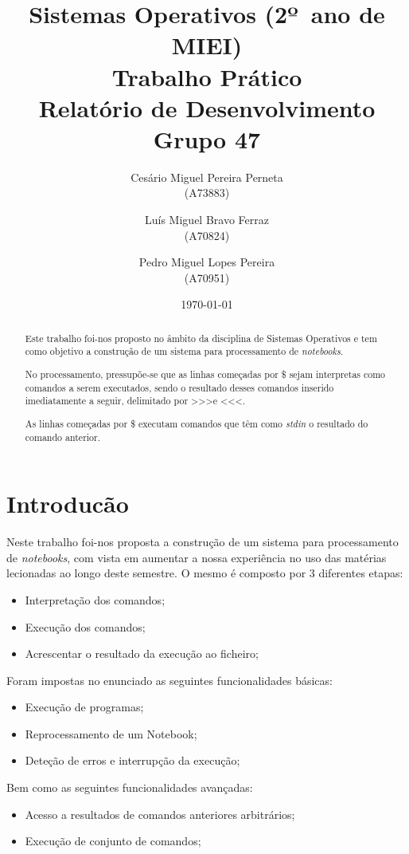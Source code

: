 \documentclass{report}
\title{Sistemas Operativos (2º\ ano de MIEI)\\ \textbf{Trabalho Prático  }\\ Relatório de Desenvolvimento\\ Grupo 47}
\author{Cesário Miguel Pereira Perneta\\ (A73883) \and Luís Miguel Bravo Ferraz\\ (A70824) \and Pedro Miguel Lopes Pereira\\ (A70951) }
\date {\today }
\begin{document}
\maketitle

\begin{abstract}

\indent Este trabalho foi-nos proposto no âmbito da disciplina de Sistemas Operativos e tem como objetivo a construção de um sistema para processamento de \textit {notebooks}.

\indent No processamento, pressupõe-se que as linhas começadas por \$ sejam interpretas como comandos a serem executados, sendo o resultado desses comandos inserido imediatamente a seguir, delimitado por \textgreater\textgreater\textgreater e \textless\textless\textless.

\indent As linhas começadas por \$ \text{\textbar} executam comandos que têm como \textit {stdin} o resultado do comando anterior.

\end{abstract}

\tableofcontents
 \newpage
\chapter{Introducão}
\indent Neste trabalho foi-nos proposta a construção de um sistema para processamento de \textit {notebooks}, com vista em aumentar a nossa experiência no uso das matérias lecionadas ao longo deste semestre. O mesmo é composto por 3 diferentes etapas:
\begin{itemize}
    \item Interpretação dos comandos;
    \item Execução dos comandos;
    \item Acrescentar o resultado da execução ao ficheiro;
\end{itemize}

\indent Foram impostas no enunciado as seguintes funcionalidades básicas:
\begin{itemize}
    \item Execução de programas;
    \item Reprocessamento de um Notebook;
    \item Deteção de erros e interrupção da execução;
\end{itemize} 

Bem como as seguintes funcionalidades avançadas:
\begin{itemize}
    \item Acesso a resultados de comandos anteriores arbitrários;
    \item Execução de conjunto de comandos;
\end{itemize}
\end{document}
